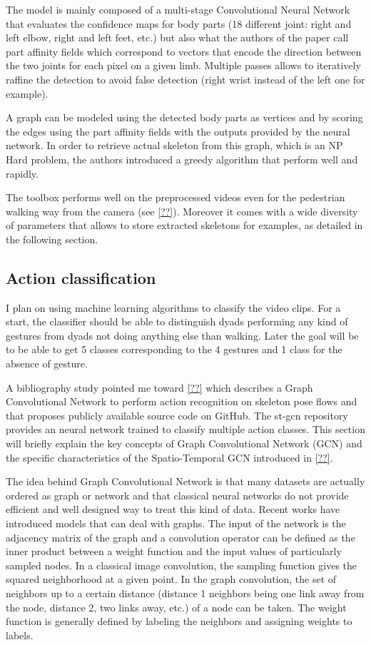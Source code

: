 \documentclass[12pt,a4paper,twoside]{article}
\begin{document}
The model is mainly composed of a multi-stage Convolutional Neural Network that evaluates the confidence maps for body parts (18 different joint: right and left elbow, right and left feet, etc.) but also what the authors of the paper call \guillemotleft part affinity fields \guillemotright which correspond to vectors that encode the direction between the two joints for each pixel on a given limb. Multiple passes allows to iteratively raffine the detection to avoid false detection (right wrist instead of the left one for example). 

A graph can be modeled using the detected body parts as vertices and by scoring the edges using the part affinity fields with the outputs provided by the neural network. In order to retrieve actual skeleton from this graph, which is an NP Hard problem, the authors  introduced a greedy algorithm that perform well and rapidly. 

The toolbox performs well on the preprocessed videos even for the pedestrian walking way from the camera (see \ref{??}). Moreover it comes with a wide diversity of parameters that allows to store extracted skeletons for examples, as detailed in the following section.

\subsection{Action classification}
I plan on using machine learning algorithms to classify the video clips. For a start, the classifier should be able to distinguish dyads performing any kind of gestures from dyads not doing anything else than walking. Later the goal will be to be able to get 5 classes corresponding to the 4 gestures and 1 class for the absence of gesture.

A bibliography study pointed me toward \ref{??} which describes a Graph Convolutional Network to perform action recognition on skeleton pose flows and that proposes publicly available source code on GitHub. The st-gcn repository provides an neural network trained to classify multiple action classes. This section will briefly explain the key concepts of Graph Convolutional Network (GCN) and the specific characteristics of the Spatio-Temporal GCN introduced in \ref{??}.

The idea behind Graph Convolutional Network is that many datasets are actually ordered as graph or network and that classical neural networks do not provide efficient and well designed way to treat this kind of data. Recent works have introduced models that can deal with graphs. The input of the network is the adjacency matrix of the graph and a convolution operator can be defined as the inner product between a weight function and the input values of particularly sampled nodes. In a classical image convolution, the sampling function gives the squared neighborhood at a given point. In the graph convolution, the set of neighbors up to a certain distance (distance 1 neighbors being one link away from the node, distance 2, two links away, etc.) of a node can be taken. The weight function is generally defined by labeling the neighbors and assigning weights to labels. 
 
\end{document}
